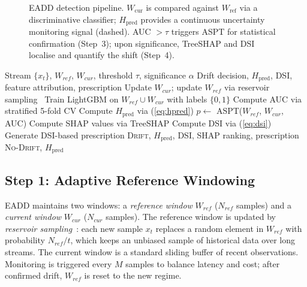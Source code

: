 \documentclass[conference,a4paper]{IEEEtran}
\begin{document}
\begin{figure}[t]
    \caption{EADD detection pipeline. $W_\mathrm{cur}$ is compared against $W_\mathrm{ref}$ via a discriminative classifier; $H_\mathrm{pred}$ provides a continuous uncertainty monitoring signal (dashed). AUC $> \tau$ triggers ASPT for statistical confirmation (Step~3); upon significance, TreeSHAP and DSI localise and quantify the shift (Step~4).}
    \label{fig:pipeline}
\end{figure}

\begin{algorithm}[htbp]
\caption{EADD Detection Cycle}
\label{alg:eadd}
\begin{algorithmic}[1]
\REQUIRE Stream $\{x_t\}$, $W_{ref}$, $W_{cur}$, threshold $\tau$, significance $\alpha$
\ENSURE Drift decision, $H_{\text{pred}}$, DSI, feature attribution, prescription
\STATE Update $W_{cur}$; update $W_{ref}$ via reservoir sampling~\cite{b22}
\STATE Train LightGBM on $W_{ref} \cup W_{cur}$ with labels $\{0,1\}$
\STATE Compute AUC via stratified 5-fold CV
\STATE Compute $H_{\text{pred}}$ via (\ref{eq:hpred})
    \STATE $p \gets$ ASPT($W_{ref}$, $W_{cur}$, AUC) 
        \STATE Compute SHAP values via TreeSHAP
        \STATE Compute DSI via (\ref{eq:dsi})
        \STATE Generate DSI-based prescription
        \RETURN \textsc{Drift}, $H_{\text{pred}}$, DSI, SHAP ranking, prescription
    \ENDIF
\ENDIF
\RETURN \textsc{No-Drift}, $H_{\text{pred}}$
\end{algorithmic}
\end{algorithm}

\subsection{Step 1: Adaptive Reference Windowing}

EADD maintains two windows: a \textit{reference window} $W_{ref}$ ($N_{ref}$ samples) and a \textit{current window} $W_{cur}$ ($N_{cur}$ samples). The reference window is updated by \textit{reservoir sampling}~\cite{b22}: each new sample $x_t$ replaces a random element in $W_{ref}$ with probability $N_{ref}/t$, which keeps an unbiased sample of historical data over long streams. The current window is a standard sliding buffer of recent observations. Monitoring is triggered every $M$ samples to balance latency and cost; after confirmed drift, $W_{ref}$ is reset to the new regime.
\end{document}
